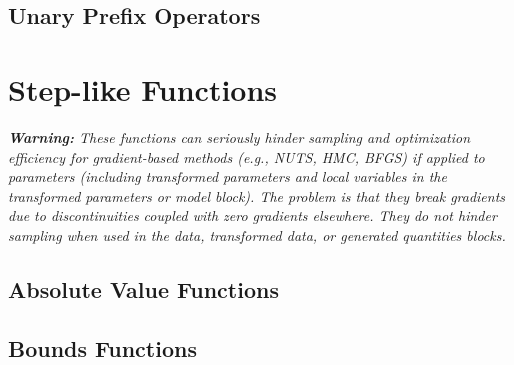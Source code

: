 \subsection{Unary Prefix Operators}

\begin{description}

\end{description}


\section{Step-like Functions}\label{step-functions.section}

{\it {\bf Warning:} These functions can seriously hinder sampling and
  optimization efficiency for gradient-based methods (e.g., NUTS, HMC,
  BFGS) if applied to parameters (including transformed parameters and
  local variables in the transformed parameters or model block).  The
  problem is that they break gradients due to discontinuities coupled with
  zero gradients elsewhere.  They do not hinder sampling when used in the
  data, transformed data, or generated quantities blocks.}

\subsection{Absolute Value Functions}

\begin{description}
%
%
%
%
\end{description}

\subsection{Bounds Functions}

\begin{description}
%
%
%
\end{description}


